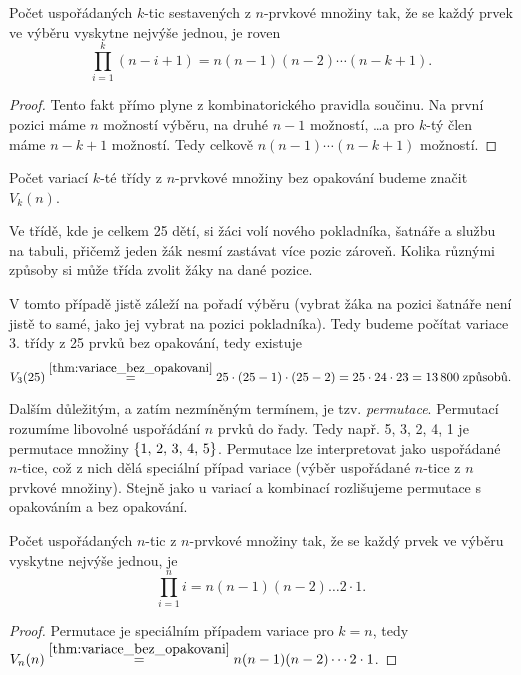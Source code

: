 \begin{theorem}\label{thm:variace_bez_opakovani}
    Počet uspořádaných $k$-tic sestavených z $n$-prvkové množiny tak, že se každý prvek ve výběru vyskytne nejvýše jednou, je roven
    \begin{equation*}
        \prod_{i=1}^{k}(n-i+1)=n(n-1)(n-2)\cdots(n-k+1).
    \end{equation*}
\end{theorem}
\begin{proof}
    Tento fakt přímo plyne z kombinatorického pravidla součinu. Na první pozici máme $n$ možností výběru, na druhé $n-1$ možností, \dots a pro $k$-tý člen máme $n-k+1$ možností. Tedy celkově $n(n-1)\cdots(n-k+1)$ možností.
\end{proof}

Počet variací $k$-té třídy z $n$-prvkové množiny bez opakování budeme značit $V_k(n)$.

\begin{task}
    Ve třídě, kde je celkem 25 dětí, si žáci volí nového pokladníka, šatnáře a službu na tabuli, přičemž jeden žák nesmí zastávat více pozic zároveň. Kolika různými způsoby si může třída zvolit žáky na dané pozice.
\end{task}
\begin{solution}
    V tomto případě jistě záleží na pořadí výběru (vybrat žáka na pozici šatnáře není jistě to samé, jako jej vybrat na pozici pokladníka). Tedy budeme počítat variace 3. třídy z 25 prvků bez opakování, tedy existuje
    \begin{equation*}
        V_3(25)\stackrel{\ref{thm:variace_bez_opakovani}}{=}25\cdot(25-1)\cdot(25-2)=25\cdot 24\cdot 23=13\,800\;\text{způsobů.}
    \end{equation*}
\end{solution}

Dalším důležitým, a zatím nezmíněným termínem, je tzv. \emph{permutace}. Permutací rozumíme libovolné uspořádání $n$ prvků do řady. Tedy např. 5, 3, 2, 4, 1 je permutace množiny $\left\{1,\,2,\,3,\,4,\,5\right\}$. Permutace lze interpretovat jako uspořádané $n$-tice, což z nich dělá speciální případ variace (výběr uspořádané $n$-tice z $n$ prvkové množiny). Stejně jako u variací a kombinací rozlišujeme permutace s opakováním a bez opakování.
\begin{theorem}
    Počet uspořádaných $n$-tic z $n$-prvkové množiny tak, že se každý prvek ve výběru vyskytne nejvýše jednou, je
    \begin{equation*}
        \prod_{i=1}^{n}i=n(n-1)(n-2)\dots 2\cdot 1.
    \end{equation*}
\end{theorem}
\begin{proof}
    Permutace je speciálním případem variace pro $k=n$, tedy $V_n(n)\stackrel{\ref{thm:variace_bez_opakovani}}{=}n(n-1)(n-2)\cdots 2\cdot 1$.
\end{proof}


